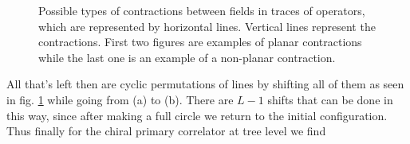 \begin{figure}[t]
\centering
{}
\label{fig:planar_nonplanar}
\caption{Possible types of contractions between fields in traces of operators, which are represented by horizontal lines. Vertical lines represent the contractions. First two figures are examples of planar contractions while the last one is an example of a non-planar contraction.}
\end{figure}
All that's left then are cyclic permutations of lines by shifting all of them as seen in fig. \ref{fig:planar_nonplanar} while going from (a) to (b). There are $L-1$ shifts that can be done in this way, since after making a full circle we return to the initial configuration. Thus finally for the chiral primary correlator at tree level we find
